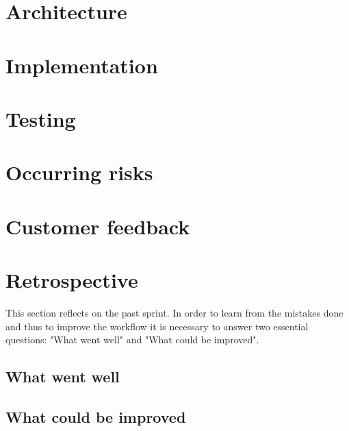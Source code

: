 \section{Architecture}
\section{Implementation}
\section{Testing}
\section{Occurring risks}
\section{Customer feedback}
\section{Retrospective}
This section reflects on the past sprint. In order to learn from the mistakes done and thus to improve the workflow it is necessary to answer two essential questions: "What went well" and "What could be improved".

\subsection{What went well}
\subsection{What could be improved}
